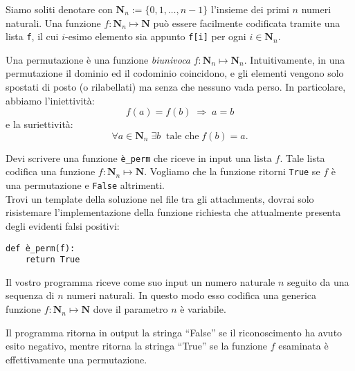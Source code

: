 \renewcommand{\nomebreve}{perm\_recognition}
\renewcommand{\titolo}{Riconoscere Permutazioni}

\introduzione{}

Siamo soliti denotare con $\mathbf{N}_n := \{0,1, \ldots, n-1 \}$ l'insieme dei primi $n$ numeri naturali.
Una funzione $f:\mathbf{N}_n \mapsto \mathbf{N}$ può essere facilmente codificata tramite una lista {\tt f}, il cui $i$-esimo elemento sia appunto {\tt f[i]} per ogni $i\in \mathbf{N}_n$.

Una permutazione è una funzione \emph{biunivoca} $f:\mathbf{N}_n \mapsto \mathbf{N}_n$.
Intuitivamente, in una permutazione il dominio ed il codominio coincidono, e gli elementi vengono solo spostati di posto (o rilabellati) ma senza che nessuno vada perso.
In particolare, abbiamo l'iniettività:
\[
   f(a) = f(b) \; \Rightarrow \; a=b
\]
e la suriettività:
\[
   \forall a\in \mathbf{N}_n  \; \exists b  \; \; \mbox{tale che}  \;f(b) = a.
\]


Devi scrivere una funzione {\tt è\_perm} che riceve in input una lista $f$.
Tale lista codifica una funzione $f:\mathbf{N}_n \mapsto \mathbf{N}$.
Vogliamo che la funzione ritorni {\tt True} se $f$ è una permutazione e {\tt False} altrimenti.\\

Trovi un template della soluzione nel file \textbf{} tra gli attachments, dovrai solo risistemare l'implementazione della funzione richiesta che attualmente presenta degli evidenti falsi positivi:

\begin{verbatim}
def è_perm(f):
    return True
\end{verbatim}


Il vostro programma riceve come suo input un numero naturale $n$ seguito da una sequenza di $n$ numeri naturali. In questo modo esso codifica una generica funzione $f:\mathbf{N}_n \mapsto \mathbf{N}$ dove il parametro $n$ è variabile.


Il programma ritorna in output la stringa ``False'' se il riconoscimento ha avuto esito negativo, mentre ritorna la stringa ``True'' se la funzione $f$ esaminata è effettivamente una permutazione.



